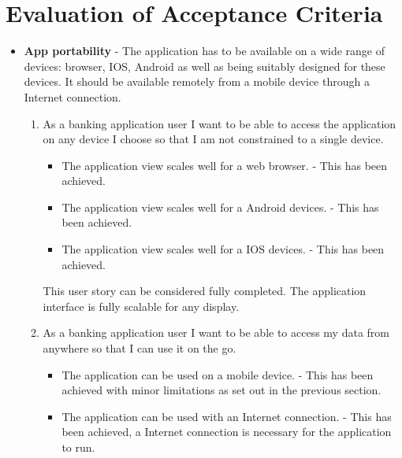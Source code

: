 \section{Evaluation of Acceptance Criteria}
\begin{itemize}
\item \textbf{App portability} - The application has to be available on a wide range of devices: browser, IOS, Android as well as being suitably designed for these devices. It should be available remotely from a mobile device through a Internet connection.
        \begin{enumerate}
        \item As a banking application user I want to be able to access the application on any device I choose so that I am not constrained to a single device.
        \begin{itemize}
                \item The application view scales well for a web browser. - This has been achieved.
                \item The application view scales well for a Android devices. - This has been achieved.
                \item The application view scales well for a IOS devices. - This has been achieved.
            \end{itemize}
            This user story can be considered fully completed. The application interface is fully scalable for any display.
        \item As a banking application user I want to be able to access my data from anywhere so that I can use it on the go.
            \begin{itemize}
                \item The application can be used on a mobile device. - This has been achieved with minor limitations as set out in the previous section.
                \item The application can be used with an Internet connection. - This has been achieved, a Internet connection is necessary for the application to run.
            \end{itemize}
\begin{center}

\end{center}
\end{enumerate}
\end{itemize}
